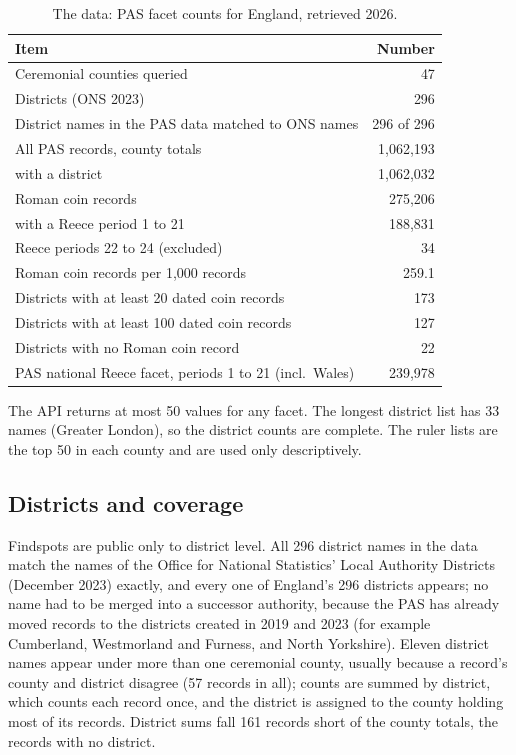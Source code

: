 \documentclass[11pt,a4paper]{article}
\begin{document}
\begin{table}[tbp]\centering\small\caption{The data: PAS facet counts for England, retrieved 2026.}\label{tab:data}\begin{tabular}{lr}\toprule Item & Number\\\midrule
Ceremonial counties queried & 47\\
Districts (ONS 2023) & 296\\
District names in the PAS data matched to ONS names & 296 of 296\\
All PAS records, county totals & 1,062,193\\
\quad with a district & 1,062,032\\
Roman coin records & 275,206\\
\quad with a Reece period 1 to 21 & 188,831\\
\quad Reece periods 22 to 24 (excluded) & 34\\
Roman coin records per 1,000 records & 259.1\\
Districts with at least 20 dated coin records & 173\\
Districts with at least 100 dated coin records & 127\\
Districts with no Roman coin record & 22\\
PAS national Reece facet, periods 1 to 21 (incl.\ Wales) & 239,978\\\bottomrule\end{tabular}\end{table}

The API returns at most 50 values for any facet. The longest district list has 33 names (Greater London), so the district counts are complete. The ruler lists are the top 50 in each county and are used only descriptively.

\subsection{Districts and coverage}
Findspots are public only to district level. All 296 district names in the data match the names of the Office for National Statistics' Local Authority Districts (December 2023) exactly, and every one of England's 296 districts appears; no name had to be merged into a successor authority, because the PAS has already moved records to the districts created in 2019 and 2023 (for example Cumberland, Westmorland and Furness, and North Yorkshire). Eleven district names appear under more than one ceremonial county, usually because a record's county and district disagree (57 records in all); counts are summed by district, which counts each record once, and the district is assigned to the county holding most of its records. District sums fall 161 records short of the county totals, the records with no district.
\end{document}
